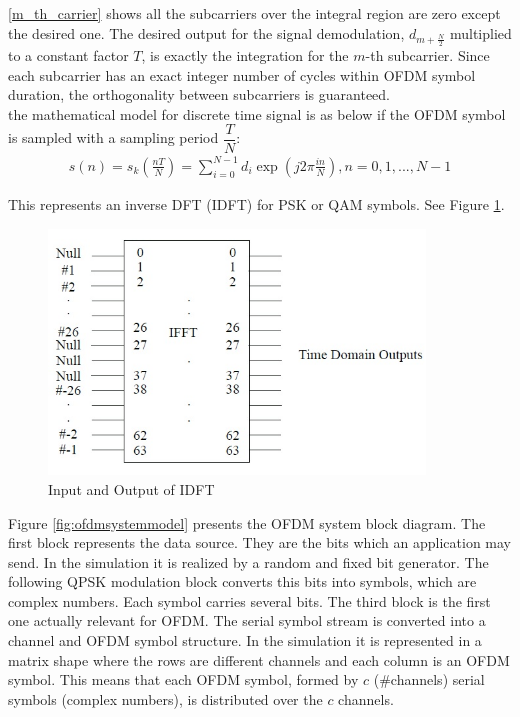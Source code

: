 \ref{m_th_carrier} shows all the subcarriers over the integral region are zero except the desired one. The desired output for the signal demodulation, $d_{m+ \frac{N}{2}}$ multiplied to a constant factor $T$, is exactly the integration for the $m$-th subcarrier. Since each subcarrier has an exact integer number of cycles within OFDM symbol duration, the orthogonality between subcarriers is guaranteed.\\
the mathematical model for discrete time signal is as below if the OFDM symbol is sampled with a sampling period $\dfrac{T}{N}$:
\begin{equation} \label{math_model}
\begin{split}
s(n)= s_{k}(\frac{nT}{N})= \sum\limits_{i=0}^{N-1} d_{i} \exp(j2\pi\frac{in}{N}), n= 0, 1, ... , N-1
\end{split}
\end{equation}

This represents an inverse DFT (IDFT) for PSK or QAM symbols.  See Figure \ref{fig:io_idft}.\\

\begin{figure}[h!]
\centering
\includegraphics[width=10cm]{content/fig/io_idft.JPG}
\caption{Input and Output of IDFT \cite{802_11}}
\label{fig:io_idft}
\end{figure}

Figure \ref{fig:ofdmsystemmodel} presents the OFDM system block diagram. The first block represents the data source. They are the bits which an application may send. In the simulation it is realized by a random and fixed bit generator. The following QPSK modulation block converts this bits into symbols, which are complex numbers. Each symbol carries several bits. The third block is the first one actually relevant for OFDM. The serial symbol stream is converted into a channel and OFDM symbol structure. In the simulation it is represented in a matrix shape where the rows are different channels and each column is an OFDM symbol. This means that each OFDM symbol, formed by $c$ (\#channels) serial symbols (complex numbers), is distributed over the $c$ channels.\\

